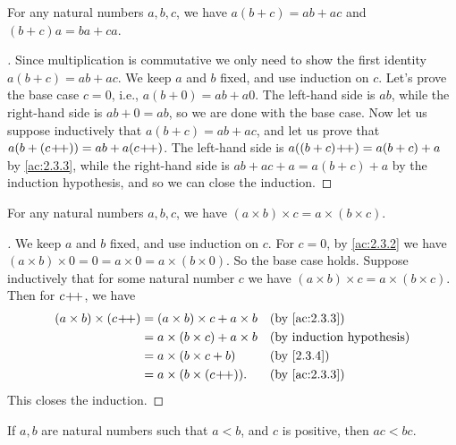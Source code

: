 \begin{prop}\label{2.3.4}
  For any natural numbers \(a, b, c\), we have \(a(b + c) = ab + ac\) and \((b + c)a = ba + ca\).
\end{prop}

\begin{proof}[]
  Since multiplication is commutative we only need to show the first identity \(a(b + c) = ab + ac\).
  We keep \(a\) and \(b\) fixed, and use induction on \(c\).
  Let's prove the base case \(c = 0\), i.e., \(a(b + 0) = ab + a0\).
  The left-hand side is \(ab\), while the right-hand side is \(ab + 0 = ab\), so we are done with the base case.
  Now let us suppose inductively that \(a(b + c) = ab + ac\), and let us prove that \(a(b + (c\!+\!\!+)) = ab + a(c\!+\!\!+)\).
  The left-hand side is \(a((b + c)\!+\!\!+) = a(b + c) + a\) by \cref{ac:2.3.3}, while the right-hand side is \(ab + ac + a = a(b + c) + a\) by the induction hypothesis, and so we can close the induction.
\end{proof}

\begin{prop}\label{2.3.5}
  For any natural numbers \(a, b, c\), we have \((a \times b) \times c = a \times (b \times c)\).
\end{prop}

\begin{proof}[]
  We keep \(a\) and \(b\) fixed, and use induction on \(c\).
  For \(c = 0\), by \cref{ac:2.3.2} we have \((a \times b) \times 0 = 0 = a \times 0 = a \times (b \times 0)\).
  So the base case holds.
  Suppose inductively that for some natural number \(c\) we have \((a \times b) \times c = a \times (b \times c)\).
  Then for \(c\!+\!\!+\), we have
  \begin{align*}
    (a \times b) \times (c\pp) & = (a \times b) \times c + a \times b &  & \by{ac:2.3.3} \\
                               & = a \times (b \times c) + a \times b &  & \byIH         \\
                               & = a \times (b \times c + b)          &  & \by{2.3.4}    \\
                               & = a \times (b \times (c\pp)).        &  & \by{ac:2.3.3}
  \end{align*}
  This closes the induction.
\end{proof}

\begin{prop}\label{2.3.6}
  If \(a, b\) are natural numbers such that \(a < b\), and \(c\) is positive, then \(ac < bc\).
\end{prop}

